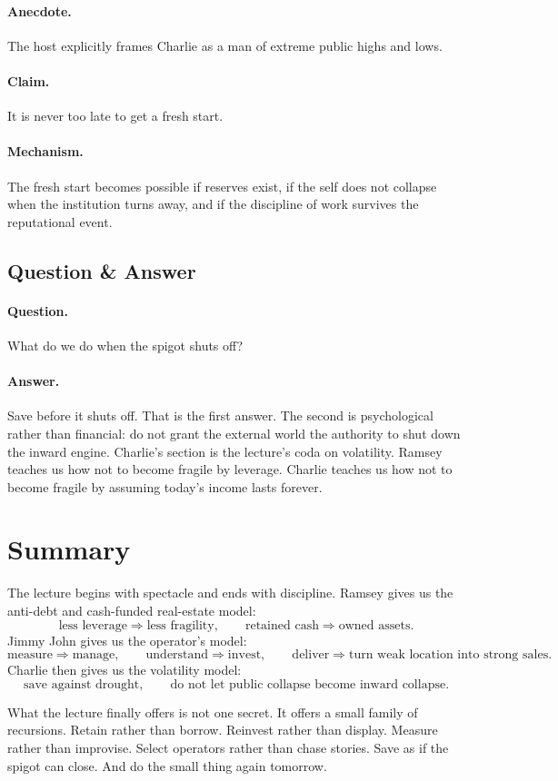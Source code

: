 \paragraph{Anecdote.} The host explicitly frames Charlie as a man of extreme public highs and lows.

\paragraph{Claim.} It is never too late to get a fresh start.

\paragraph{Mechanism.} The fresh start becomes possible if reserves exist, if the self does not collapse when the institution turns away, and if the discipline of work survives the reputational event.

\subsection{Question \& Answer}

\paragraph{Question.} What do we do when the spigot shuts off?

\paragraph{Answer.} Save before it shuts off. That is the first answer. The second is psychological rather than financial: do not grant the external world the authority to shut down the inward engine. Charlie's section is the lecture's coda on volatility. Ramsey teaches us how not to become fragile by leverage. Charlie teaches us how not to become fragile by assuming today's income lasts forever.

\section{Summary}

The lecture begins with spectacle and ends with discipline. Ramsey gives us the anti-debt and cash-funded real-estate model:
\[
\text{less leverage} \Rightarrow \text{less fragility}, \qquad
\text{retained cash} \Rightarrow \text{owned assets}.
\]
Jimmy John gives us the operator's model:
\[
\text{measure} \Rightarrow \text{manage}, \qquad
\text{understand} \Rightarrow \text{invest}, \qquad
\text{deliver} \Rightarrow \text{turn weak location into strong sales}.
\]
Charlie then gives us the volatility model:
\[
\text{save against drought}, \qquad
\text{do not let public collapse become inward collapse}.
\]

What the lecture finally offers is not one secret. It offers a small family of recursions. Retain rather than borrow. Reinvest rather than display. Measure rather than improvise. Select operators rather than chase stories. Save as if the spigot can close. And do the small thing again tomorrow.